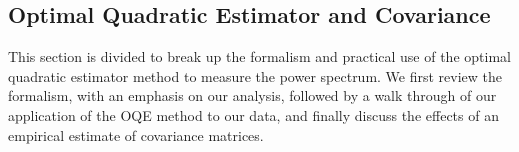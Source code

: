 \documentclass[twocolumn,numberedappendix]{emulateapj} \shorttitle{PSA64}
\begin{document}




\subsection{Optimal Quadratic Estimator and Covariance}\label{sec:oqe}
This section is divided to break up the formalism and practical use of the
optimal quadratic estimator method to measure the power spectrum. We first
review the formalism, with an emphasis on our analysis, followed by a walk
through of our application of the OQE method to our data, and finally discuss
the effects of an empirical estimate of covariance matrices.
\end{document}
